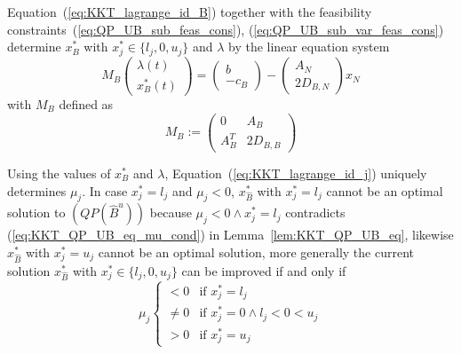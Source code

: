 \documentclass[a4paper]{article}
\begin{document}
Equation~(\ref{eq:KKT_lagrange_id_B}) together with the feasibility
constraints~(\ref{eq:QP_UB_sub_feas_cons}), (\ref{eq:QP_UB_sub_var_feas_cons})
determine $x_{B}^{*}$ with $x_{j}^{*} \in \{l_{j}, 0, u_{j}\}$ and $\lambda$ by
the linear equation system
\begin{equation}
M_{B}
\left(
\begin{array}{c}
\lambda(t) \\
\hline
x_{B}^{*}(t)
\end{array}
\right)
=
\left(
\begin{array}{c}
b \\
\hline
-c_{B}
\end{array}
\right)
-
\left(
\begin{array}{c}
A_{N} \\
\hline
2D_{B, N}
\end{array}
\right)
x_{N}
\end{equation}
with $M_{B}$ defined as
\begin{equation}
M_{B}:=
\left(
\begin{array}{c|c}
0 & A_{B} \\
\hline
A_{B}^{T} & 2D_{B,B}
\end{array}
\right)
\end{equation}

Using the values of $x_{B}^{*}$ and $\lambda$,
Equation~(\ref{eq:KKT_lagrange_id_j}) uniquely determines $\mu_{j}$.
In case $x_{j}^{*}=l_{j}$ and $\mu_{j} < 0$, $x_{\hat{B}}^{*}$ with
$x_{j}^{*}=l_{j}$ cannot
be an optimal solution to $(QP(\hat{B}^{u}))$ because
$\mu_{j}<0 \wedge x_{j}^{*}=l_{j}$ contradicts (\ref{eq:KKT_QP_UB_eq_mu_cond})
in Lemma~\ref{lem:KKT_QP_UB_eq}, likewise $x_{\hat{B}}^{*}$ with
$x_{j}^{*}=u_{j}$ cannot be an optimal solution, more generally the current solution $x_{\hat{B}}^{*}$ with $x_{j}^{*} \in \{l_{j}, 0, u_{j}\}$ can be
improved if and only if
\begin{equation}
\mu_{j}
\left\{
\begin{array}{ll}
< 0    & \text{if $x_{j}^{*}=l_{j}$} \\
\neq 0 & \text{if $x_{j}^{*}=0 \wedge l_{j} < 0 < u_{j}$} \\
> 0    & \text{if $x_{j}^{*}=u_{j}$}
\end{array}
\right.
\end{equation}
\end{document}
